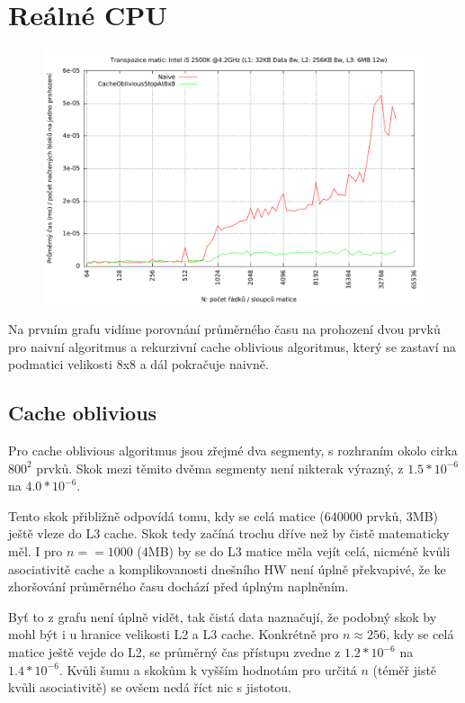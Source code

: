 \documentclass[12pt,a4paper]{report}
\begin{document}
	
	\section{Reálné CPU}
	\begin{figure}[h]	
		\centering	
		\includegraphics[scale=0.6]{graph_1}		
	\end{figure}

	Na prvním grafu vidíme porovnání průměrného času na prohození dvou prvků pro naivní algoritmus a rekurzivní cache oblivious algoritmus, který se zastaví na podmatici velikosti 8x8 a dál pokračuje naivně. 
	
	\subsection{Cache oblivious}
	
	Pro cache oblivious algoritmus jsou zřejmé dva segmenty, s rozhraním okolo cirka $800^2$ prvků. Skok mezi těmito dvěma segmenty není nikterak výrazný, z $1.5 * 10^{-6}$ na $4.0 * 10^{-6}$.
	
	Tento skok přibližně odpovídá tomu, kdy se celá matice ($640 000$ prvků, 3MB) ještě vleze do L3 cache. Skok tedy začíná trochu dříve než by čistě matematicky měl. I pro $n == 1000$ (4MB) by se do L3 matice měla vejít celá, nicméně kvůli asociativitě cache a komplikovanosti dnešního HW není úplně překvapivé, že ke zhoršování průměrného času dochází před úplným naplněním.
	
	Byť to z grafu není úplně vidět, tak čistá data naznačují, že podobný skok by mohl být i u hranice velikosti L2 a L3 cache. Konkrétně pro $n \approx 256$, kdy se celá matice ještě vejde do L2, se průměrný čas přístupu zvedne z $1.2 * 10^{-6}$ na $1.4 * 10^{-6}$. Kvůli šumu a skokům k vyšším hodnotám pro určitá $n$ (téměř jistě kvůli asociativitě) se ovšem nedá říct nic s jistotou. 
	
\end{document}
